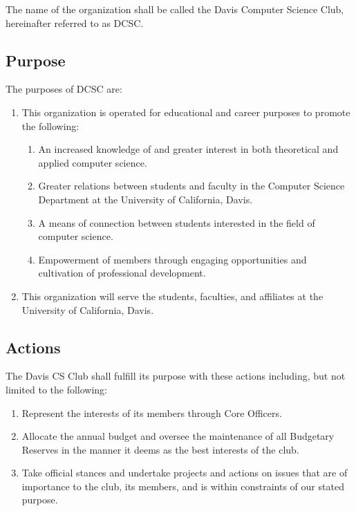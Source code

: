 \documentclass{article}
\newenvironment{li}{
\begin{enumerate}
  \setlength{\itemsep}{1pt}
  \setlength{\parskip}{0pt}
  \setlength{\parsep}{0pt}
}{\end{enumerate}}
\begin{document}
The name of the organization shall be called the Davis Computer Science Club, hereinafter referred to as DCSC.

\subsection{Purpose}
The purposes of DCSC are:
\begin{li}
	\item This organization is operated for educational and career purposes to promote the following:
	\begin{li}
		\item An increased knowledge of and greater interest in both theoretical and applied computer science.
		\item Greater relations between students and faculty in the Computer Science Department at the University of California, Davis.
		\item A means of connection between students interested in the field of computer science.
		\item Empowerment of members through engaging opportunities and cultivation of professional development.
	\end{li}
	\item This organization will serve the students, faculties, and affiliates at the University of California, Davis.
\end{li}

\subsection{Actions}
The Davis CS Club shall fulfill its purpose with these actions including, but not limited to the following:
\begin{li}
\item Represent the interests of its members through Core Officers.
\item Allocate the annual budget and oversee the maintenance of all Budgetary Reserves in the manner it deems as the best interests of the club.
\item Take official stances and undertake projects and actions on issues that are of importance to the club, its members, and is within constraints of our stated purpose.
\end{li}
\end{document}
